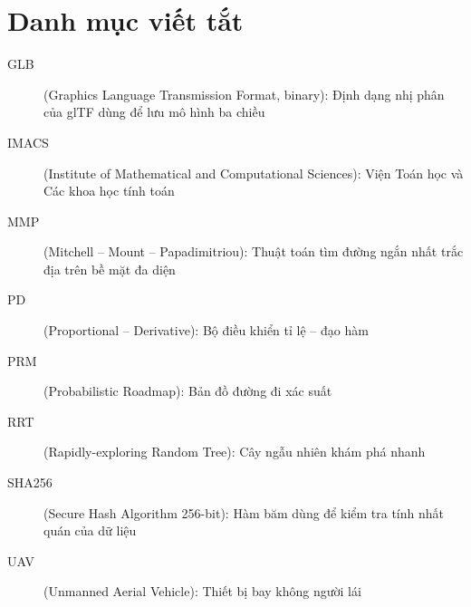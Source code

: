 
\section{Danh mục viết tắt}

\begin{description}
  \item[GLB] (Graphics Language Transmission Format, binary): Định dạng nhị phân của
        glTF dùng để lưu mô hình ba chiều
  \item[IMACS] (Institute of Mathematical and Computational Sciences): Viện Toán học
        và Các khoa học tính toán
  \item[MMP] (Mitchell -- Mount -- Papadimitriou): Thuật toán tìm đường ngắn nhất
        trắc địa trên bề mặt đa diện
  \item[PD] (Proportional -- Derivative): Bộ điều khiển tỉ lệ -- đạo hàm
  \item[PRM] (Probabilistic Roadmap): Bản đồ đường đi xác suất
  \item[RRT] (Rapidly-exploring Random Tree): Cây ngẫu nhiên khám phá nhanh
  \item[SHA256] (Secure Hash Algorithm 256-bit): Hàm băm dùng để kiểm tra tính nhất
        quán của dữ liệu
  \item[UAV] (Unmanned Aerial Vehicle): Thiết bị bay không người lái
\end{description}
